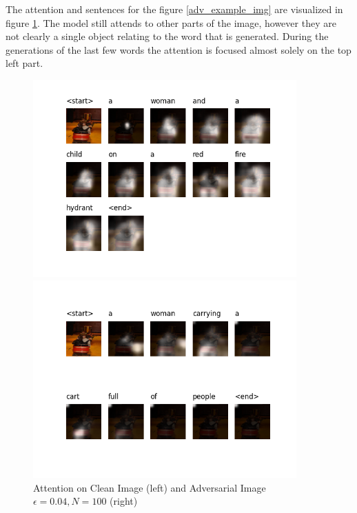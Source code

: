 The attention and sentences for the figure \ref{adv_example_img} are visualized in figure \ref{adv_example_att}. The model still attends to other parts of the image, however they are not clearly a single object relating to the word that is generated. During the generations of the last few words the attention is focused almost solely on the top left part. 

\begin{figure}
    \centering
    \begin{minipage}{0.45\textwidth}
        \centering
        \includegraphics[width=0.9\textwidth]{figures/caption_distraction_adv_sample_0.png} %
    \end{minipage}\hfill
    \begin{minipage}{0.45\textwidth}
        \centering
        \includegraphics[width=0.9\textwidth]{figures/caption_distraction_adv_sample_0.04.png} %
    \end{minipage}
    \caption{Attention on Clean Image (left) and Adversarial Image $\epsilon=0.04, N=100$ (right)}
    \label{adv_example_att}
\end{figure}


